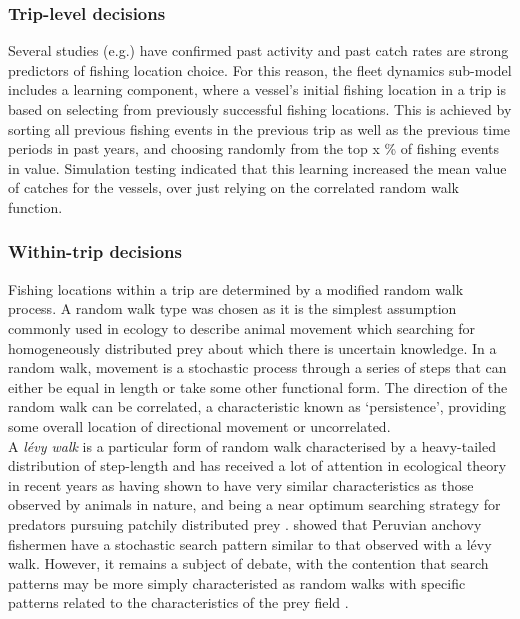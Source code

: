 \documentclass[review]{elsarticle}
\begin{document}
\subsubsection{Trip-level decisions}

Several studies (e.g.\cite{Hutton2004, Tidd2012, Girardin2015}) have confirmed
past activity and past catch rates are strong predictors of fishing location
choice. For this reason, the fleet dynamics sub-model includes a learning
component, where a vessel's initial fishing location in a trip is based on
selecting from previously successful fishing locations. This is achieved by
sorting all previous fishing events in the previous trip as well as the
previous time periods in past years, and choosing randomly from the top x \% of
fishing events in value.  Simulation testing indicated that this learning
increased the mean value of catches for the vessels, over just relying on the
correlated random walk function. 

\subsubsection{Within-trip decisions}

Fishing locations within a trip are determined by a modified random walk
process. A random walk type was chosen as it is the simplest assumption
commonly used in ecology to describe animal movement which searching for
homogeneously distributed prey about which there is uncertain knowledge. In a
random walk, movement is a stochastic process through a series of steps that
can either be equal in length or take some other functional form.  The
direction of the random walk can be correlated, a characteristic known as
`persistence', providing some overall location of directional movement
\cite{Codling2008} or uncorrelated. \\

A \textit{lévy walk} is a particular form of random walk characterised by a
heavy-tailed distribution of step-length and has received a lot of attention in
ecological theory in recent years as having shown to have very similar
characteristics as those observed by animals in nature, and being a near
optimum searching strategy for predators pursuing patchily distributed prey
\cite{Bartumeus2005, Sims2008}.  \cite{Bertrand2007} showed that Peruvian
anchovy fishermen have a stochastic search pattern similar to that observed
with a lévy walk. However, it remains a subject of debate, with the contention
that search patterns may be more simply characteristed as random walks
\cite{Sakiyama2013} with specific patterns related to the characteristics of
the prey field \cite{Sims2012}. \\
\end{document}
